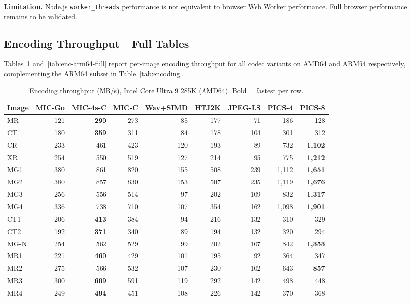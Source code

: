 \documentclass[journal]{IEEEtran}
\begin{document}
\textbf{Limitation.} Node.js \texttt{worker\_threads} performance is not
equivalent to browser Web Worker performance. Full browser performance remains
to be validated.

\subsection{Encoding Throughput---Full Tables}

Tables~\ref{tab:enc-amd64} and~\ref{tab:enc-arm64-full} report per-image
encoding throughput for all codec variants on AMD64 and ARM64 respectively,
complementing the ARM64 subset in Table~\ref{tab:encoding}.

\begin{table}[htbp]
\centering
\caption{Encoding throughput (MB/s), Intel Core Ultra 9 285K (AMD64). Bold =
fastest per row.}
\label{tab:enc-amd64}
\scriptsize
\begin{tabular}{lrrrrrrrr}
\toprule
Image & MIC-Go & MIC-4s-C & MIC-C & Wav+SIMD & HTJ2K & JPEG-LS & PICS-4 & PICS-8 \\
\midrule
MR  & 121 & \textbf{290} & 273 & 85 & 177 & 71 & 186 & 128 \\
CT  & 180 & \textbf{359} & 311 & 84 & 178 & 104 & 301 & 312 \\
CR  & 233 & 461 & 423 & 120 & 193 & 89 & 732 & \textbf{1,102} \\
XR  & 254 & 550 & 519 & 127 & 214 & 95 & 775 & \textbf{1,212} \\
MG1 & 380 & 861 & 820 & 155 & 508 & 239 & 1,112 & \textbf{1,651} \\
MG2 & 380 & 857 & 830 & 153 & 507 & 235 & 1,119 & \textbf{1,676} \\
MG3 & 256 & 556 & 514 & 97 & 202 & 109 & 832 & \textbf{1,317} \\
MG4 & 336 & 738 & 710 & 107 & 354 & 162 & 1,098 & \textbf{1,901} \\
CT1 & 206 & \textbf{413} & 384 & 94 & 216 & 132 & 310 & 329 \\
CT2 & 192 & \textbf{371} & 340 & 89 & 194 & 132 & 320 & 294 \\
MG-N & 254 & 562 & 529 & 99 & 202 & 107 & 842 & \textbf{1,353} \\
MR1 & 221 & \textbf{460} & 429 & 101 & 195 & 92 & 364 & 347 \\
MR2 & 275 & 566 & 532 & 107 & 230 & 102 & 643 & \textbf{857} \\
MR3 & 300 & \textbf{609} & 591 & 119 & 292 & 142 & 498 & 448 \\
MR4 & 249 & \textbf{494} & 451 & 108 & 226 & 142 & 370 & 368 \\

\end{tabular}
\end{table}
\end{document}
